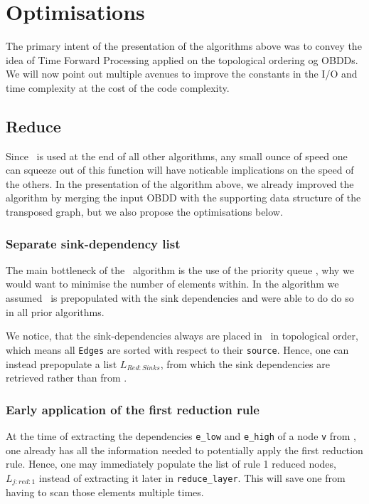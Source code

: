 \section{Optimisations} \label{sec:optimisations}
The primary intent of the presentation of the algorithms above was to convey the
idea of Time Forward Processing applied on the topological ordering og OBDDs. We
will now point out multiple avenues to improve the constants in the I/O and time
complexity at the cost of the code complexity.

\subsection{Reduce}
Since \Reduce\ is used at the end of all other algorithms, any small ounce of
speed one can squeeze out of this function will have noticable implications on
the speed of the others. In the presentation of the algorithm above, we already
improved the algorithm by merging the input OBDD with the supporting data
structure of the transposed graph, but we also propose the optimisations below.

\subsubsection{Separate sink-dependency list}
The main bottleneck of the \Reduce\ algorithm is the use of the priority queue
\ReduceQdep, why we would want to minimise the number of elements within. In the
algorithm we assumed \ReduceQdep\ is prepopulated with the sink dependencies and
were able to do do so in all prior algorithms.

We notice, that the sink-dependencies always are placed in \ReduceQdep\ in
topological order, which means all \lstinline{Edges} are sorted with respect to
their \lstinline{source}. Hence, one can instead prepopulate a list
$L_{\mathit{Red:}Sinks}$, from which the sink dependencies are retrieved rather
than from \ReduceQdep.


\subsubsection{Early application of the first reduction rule}
At the time of extracting the dependencies \lstinline{e_low} and
\lstinline{e_high} of a node \lstinline{v} from \ReduceQdep, one already has all
the information needed to potentially apply the first reduction rule. Hence, one
may immediately populate the list of rule 1 reduced nodes,
$L_{j:\mathit{red}:1}$ instead of extracting it later in
\lstinline{reduce_layer}. This will save one from having to scan those elements
multiple times.

